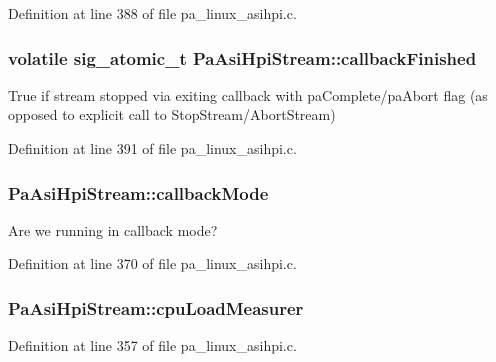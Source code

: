 Definition at line 388 of file pa\+\_\+linux\+\_\+asihpi.\+c.

\subsubsection[{\texorpdfstring{callback\+Finished}{callbackFinished}}]{\setlength{\rightskip}{0pt plus 5cm}volatile sig\+\_\+atomic\+\_\+t Pa\+Asi\+Hpi\+Stream\+::callback\+Finished}\hypertarget{struct_pa_asi_hpi_stream_aa85410e770efbd7cfed99452c314809f}{}\label{struct_pa_asi_hpi_stream_aa85410e770efbd7cfed99452c314809f}
True if stream stopped via exiting callback with pa\+Complete/pa\+Abort flag (as opposed to explicit call to Stop\+Stream/\+Abort\+Stream) 

Definition at line 391 of file pa\+\_\+linux\+\_\+asihpi.\+c.

\subsubsection[{\texorpdfstring{callback\+Mode}{callbackMode}}]{ Pa\+Asi\+Hpi\+Stream\+::callback\+Mode}\hypertarget{struct_pa_asi_hpi_stream_a9ec09a8e74639bef0acf580cb33f9a35}{}\label{struct_pa_asi_hpi_stream_a9ec09a8e74639bef0acf580cb33f9a35}
Are we running in callback mode? 

Definition at line 370 of file pa\+\_\+linux\+\_\+asihpi.\+c.

\subsubsection[{\texorpdfstring{cpu\+Load\+Measurer}{cpuLoadMeasurer}}]{ Pa\+Asi\+Hpi\+Stream\+::cpu\+Load\+Measurer}\hypertarget{struct_pa_asi_hpi_stream_af369ced5674ff0a5f622a1b58232bfc4}{}\label{struct_pa_asi_hpi_stream_af369ced5674ff0a5f622a1b58232bfc4}


Definition at line 357 of file pa\+\_\+linux\+\_\+asihpi.\+c.

